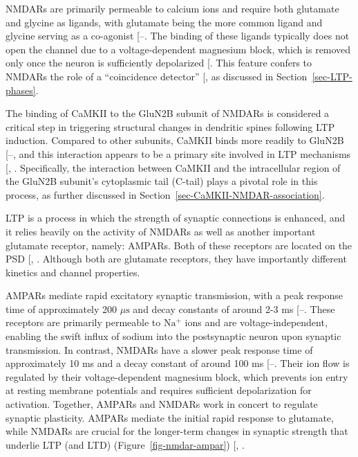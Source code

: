 \documentclass[
  11pt,
  letterpaper,
]{scrreprt}
\begin{document}
NMDARs are primarily permeable to calcium ions and require both
glutamate and glycine as ligands, with glutamate being the more common
ligand and glycine serving as a co-agonist
{[}--\citeproc{ref-hansen2018Structure}{121}{]}.
The binding of these ligands typically does not open the channel due to
a voltage-dependent magnesium block, which is removed only once the
neuron is sufficiently depolarized
{[}\citeproc{ref-ruppersberg1994Mechanism}{122}{]}. This feature confers
to NMDARs the role of a ``coincidence detector''
{[}\citeproc{ref-seeburg1995NMDA}{123}{]}, as discussed in
Section~\ref{sec-LTP-phases}.

The binding of CaMKII to the GluN2B subunit of NMDARs is considered a
critical step in triggering structural changes in dendritic spines
following LTP induction. Compared to other subunits, CaMKII binds more
readily to GluN2B
{[}--\citeproc{ref-barria2005NMDA}{126}{]},
and this interaction appears to be a primary site involved in LTP
mechanisms {[},
\citeproc{ref-bayer2001Interactiona}{127}{]}. Specifically, the
interaction between CaMKII and the intracellular region of the GluN2B
subunit's cytoplasmic tail (C-tail) plays a pivotal role in this
process, as further discussed in
Section~\ref{sec-CaMKII-NMDAR-association}.

LTP is a process in which the strength of synaptic connections is
enhanced, and it relies heavily on the activity of NMDARs as well as
another important glutamate receptor, namely: AMPARs. Both of these
receptors are located on the PSD
{[},
\citeproc{ref-chater2014Role}{129}{]}. Although both are glutamate
receptors, they have importantly different kinetics and channel
properties.

AMPARs mediate rapid excitatory synaptic transmission, with a peak
response time of approximately 200 \(\mu\text{s}\) and decay constants
of around 2-3 ms
{[}--\citeproc{ref-choquet2010Fast}{132}{]}.
These receptors are primarily permeable to \(\mathrm{Na^{+}}\) ions and
are voltage-independent, enabling the swift influx of sodium into the
postsynaptic neuron upon synaptic transmission. In contrast, NMDARs have
a slower peak response time of approximately 10 ms and a decay constant
of around 100 ms
{[}--\citeproc{ref-tovar2017Modulating}{135}{]}.
Their ion flow is regulated by their voltage-dependent magnesium block,
which prevents ion entry at resting membrane potentials and requires
sufficient depolarization for activation. Together, AMPARs and NMDARs
work in concert to regulate synaptic plasticity. AMPARs mediate the
initial rapid response to glutamate, while NMDARs are crucial for the
longer-term changes in synaptic strength that underlie LTP (and LTD)
(Figure~\ref{fig-nmdar-ampar})
{[},
\citeproc{ref-brown2022Synaptic}{137}{]}.
\end{document}
